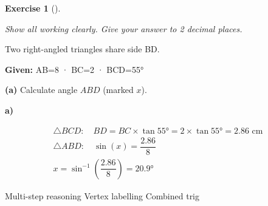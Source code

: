 \documentclass[
  letterpaper,
  DIV=11,
  numbers=noendperiod]{scrreprt}
\theoremstyle{definition}
\newtheorem{exercise}{Exercise}[chapter]
\theoremstyle{remark}
\begin{document}
\begin{exercise}[]\protect\hypertarget{exr-trig-26}{}\label{exr-trig-26}

\emph{Show all working clearly. Give your answer to 2 decimal places.}

Two right-angled triangles share side BD.

\textbf{Given:} AB=8 · BC=2 · \angle BCD=55°

\textbf{(a)} Calculate angle \(ABD\) (marked \(x\)).

\begin{tcolorbox}[enhanced jigsaw, opacitybacktitle=0.6, coltitle=black, arc=.35mm, colframe=quarto-callout-tip-color-frame, colback=white, bottomrule=.15mm, left=2mm, colbacktitle=quarto-callout-tip-color!10!white, titlerule=0mm, opacityback=0, title=\textcolor{quarto-callout-tip-color}{\faLightbulb}\hspace{0.5em}{🔍 View Solution}, leftrule=.75mm, breakable, rightrule=.15mm, bottomtitle=1mm, toptitle=1mm, toprule=.15mm]

\textbf{a)}

\[
\begin{aligned}
\triangle BCD: \quad BD = BC \times \tan 55° = 2 \times \tan 55° = 2.86 \text{ cm} \\ \triangle ABD: \quad \sin(x) = \dfrac{2.86}{8} \\ x = \sin^{-1}\!\left(\dfrac{2.86}{8}\right) = 20.9°
\end{aligned}
\]

\end{tcolorbox}

{Multi-step reasoning} {Vertex labelling} {Combined trig}

\end{exercise}
\end{document}
